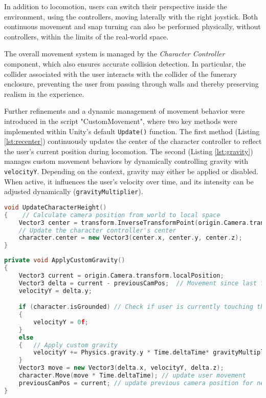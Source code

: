 In addition to locomotion, users can switch their perspective inside the environment, using the controllers, moving laterally with the right joystick.
Both continuous movement and snap turning can also be performed physically, without controllers, within the limits of the real-world space.

The overall movement system is managed by the \emph{Character Controller} component, which also ensures accurate collision detection. In particular, the collider associated with the user interacts with the collider of the funerary enclosure, preventing the user from passing through walls and thereby preserving realism in the experience.

Further refinements and a dynamic management of movement behavior were introduced in the script "CustomMovement", where two key methods were implemented within Unity’s default \texttt{Update()} function.
The first method (Listing \ref{lst:recenter}) continuously updates the center of the character controller to reflect the user’s current position during locomotion. 
The second (Listing \ref{lst:gravity}) manages custom movement behaviors by dynamically controlling gravity with \texttt{velocityY}. 
Depending on the context, gravity may either be applied or disabled. When active, it influences the user’s velocity over time, and its intensity can be adjusted dynamically (\texttt{gravityMultiplier}).

\begin{lstlisting}[language=C++, caption={Recenter user position method.}, label={lst:recenter},float]
void UpdateCharacterHeight()
{    // Calculate camera position from world to local space
    Vector3 center = transform.InverseTransformPoint(origin.Camera.transform.position);
    // Update the character controller's center 
    character.center = new Vector3(center.x, center.y, center.z);
}
\end{lstlisting}


\begin{lstlisting}[language=C++, caption={Apply costum gravity method.}, label={lst:gravity},float]
private void ApplyCustomGravity()
{
    Vector3 current = origin.Camera.transform.localPosition;
    Vector3 delta = current - previousCamPos;  // Movement since last frame
    velocityY = delta.y;

    if (character.isGrounded) // Check if user is currently touching the ground plan
    {
        velocityY = 0f;
    }
    else
    {   // Apply custom gravity 
        velocityY += Physics.gravity.y * Time.deltaTime* gravityMultiplier;
    }
    Vector3 move = new Vector3(delta.x, velocityY, delta.z);
    character.Move(move * Time.deltaTime); // update user movement
    previousCamPos = current; // update previous camera position for next frame
}
\end{lstlisting}

